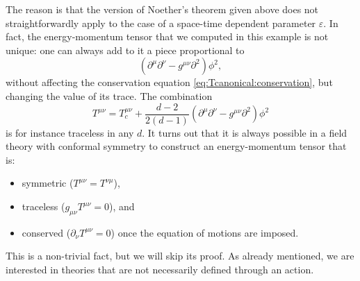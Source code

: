 \documentclass[a4paper,12pt]{article}
\numberwithin{equation}{section}
\begin{document}
The reason is that the version of Noether's theorem given above does not straightforwardly apply to the case of a space-time dependent parameter $\varepsilon$. In fact, the energy-momentum tensor that we computed in this example is not unique: one can always add to it a piece proportional to
\begin{equation}
	\left( \partial^\mu \partial^\nu - g^{\mu\nu} \partial^2 \right)
	\phi^2,
\end{equation}
without affecting the conservation equation \eqref{eq:Tcanonical:conservation}, but changing the value of its trace. The combination
\begin{equation}
	T^{\mu\nu} = T^{\mu\nu}_c + \frac{d-2}{2(d-1)}
	\left( \partial^\mu \partial^\nu - g^{\mu\nu} \partial^2 \right)
	\phi^2
\end{equation}
is for instance traceless in any $d$.
It turns out that it is always possible in a field theory with conformal symmetry to construct an energy-momentum tensor that is:
\begin{itemize}
\item symmetric ($T^{\mu\nu} = T^{\nu\mu}$),
\item traceless ($g_{\mu\nu} T^{\mu\nu} = 0$), and
\item conserved ($\partial_\nu T^{\mu\nu} = 0$) once the equation of motions are imposed.
\end{itemize}
This is a non-trivial fact, but we will skip its proof. As already mentioned, we are interested in theories that are not necessarily defined through an action.
\end{document}
